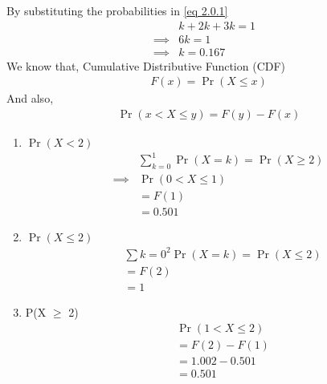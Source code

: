 \documentclass{article}
\providecommand{\pr}[1]{\ensuremath{\Pr\left(#1\right)}}
\begin{document}
\begin{enumerate}
By substituting the probabilities in \eqref{eq 2.0.1}
\begin{align}
&k + 2k + 3k  = 1 &\\
\implies&  6k = 1 &\\
\implies&k = 0.167&
\end{align}
We know that, Cumulative Distributive Function (CDF) 
\begin{align}
    F(x) = \pr{X \le x}
\end{align}
And also, 
\begin{align}
     \pr{x < X \le y} = F(y) - F(x) 
\end{align}
 \begin{enumerate}
        \item \pr{X < 2}
           \begin{align}
            & \sum_{k = 0}^1 \pr{X = k} = \pr{X \ge 2}\\
            \implies& \pr{0 < X \le 1} \\
             & = F(1)\\
            & = 0.501
        \end{align}
        \item \pr{X \leq 2}
        \begin{align}
         &\sum{k = 0}^2  \pr{X = k} = \pr{X \le 2}\\
           & = F(2)\\
            & = 1   
         \end{align}
       
        
        \item P(X $\geq$ 2)
        \begin{align}
            &\pr{1 < X \le 2} \\
             & = F(2) - F(1)\\
            & = 1.002 - 0.501\\
            & = 0.501
        \end{align}
     
\end{enumerate}
\end{enumerate}
\end{document}
